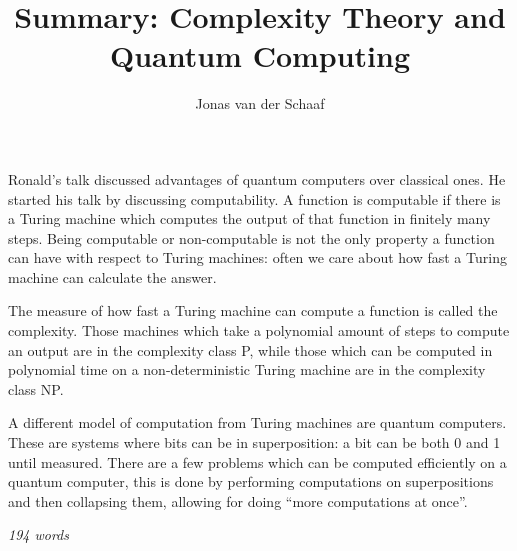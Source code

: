 \documentclass{article}
\title{Summary: Complexity Theory and Quantum Computing}
\author{Jonas van der Schaaf}
\date{}
\begin{document}
\maketitle

Ronald's talk discussed advantages of quantum computers over classical ones. He
started his talk by discussing computability. A function is computable if there
is a Turing machine which computes the output of that function in finitely many
steps. Being computable or non-computable is not the only property a function
can have with respect to Turing machines: often we care about how fast a Turing
machine can calculate the answer.

The measure of how fast a Turing machine can compute a function is called the
complexity. Those machines which take a polynomial amount of steps to compute an
output are in the complexity class P, while those which can be computed in
polynomial time on a non-deterministic Turing machine are in the complexity
class NP.

A different model of computation from Turing machines are quantum computers.
These are systems where bits can be in superposition: a bit can be both 0 and 1
until measured. There are a few problems which can be computed efficiently on a
quantum computer, this is done by performing computations on superpositions and
then collapsing them, allowing for doing ``more computations at once''.

\hfill\emph{194 words}
\end{document}
